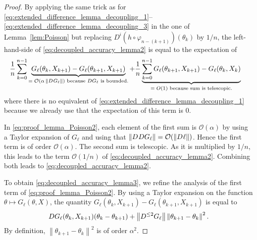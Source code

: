 \documentclass{article}
\newcommand\norm[1]{\left\|#1\right\|}
\newcommand\bO[1]{\mathcal{O}(#1)}
\newcommand\normop[2][]{\norm{D^{\ifthenelse{\equal{#1}{}}{}{\le #1}}#2}}
\begin{document}
\begin{proof}
    By applying the same trick as for \eqref{eq:extended_difference_lemma_decoupling_1}--\eqref{eq:extended_difference_lemma_decoupling_3} in the one of Lemma~\ref{lem:Poisson} but replacing $D^i(h \circ \varphi_{n-(k+1)})(\theta_{k})$ by $1/n$, the left-hand-side of \eqref{eq:decoupled_accuracy_lemma2} is equal to the expectation of
    \begin{align}
        \label{eq:proof_lemma_Poisson2}
        &\frac1n \sum_{k=0}^{n-1}\underbrace{G_\ell(\theta_{k}, X_{k+1}) - G_\ell(\theta_{k+1}, X_{k+1})}_{\text{$=\bO{\alpha\normop{G_\ell}}$ because $DG_\ell$ is bounded.}}
         + \frac1n \underbrace{ \sum_{k=0}^{n-1} G_\ell(\theta_{k+1}, X_{k+1}) - G_\ell(\theta_{k}, X_{k})}_{\text{$=O(1)$ because sum is telescopic.}}
    \end{align}
    where there is no equivalent of \eqref{eq:extended_difference_lemma_decoupling_1} because we already use that the expectation of this term is $0$. 
    
    In \eqref{eq:proof_lemma_Poisson2}, each element of the first sum is $\bO{\alpha}$ by using a Taylor expansion of $G_\ell$ and using that $\normop{DG_\ell}=\bO{\normop{\ell}}$. Hence the first term is of order $\bO{\alpha}$. The second sum is telescopic. As it is multiplied by $1/n$, this leads to the term $\bO{1/n}$ of \eqref{eq:decoupled_accuracy_lemma2}. Combining both leads to \eqref{eq:decoupled_accuracy_lemma2}. 
    
    \medskip
    
    To obtain \eqref{eq:decoupled_accuracy_lemma3}, we refine the analysis of the first term of \eqref{eq:proof_lemma_Poisson2}. By using a Taylor expansion on the function $\theta\mapsto G_\ell(\theta,X)$, the quantity $ G_\ell(\theta_{k}, X_{k+1}) - G_\ell(\theta_{k+1}, X_{k+1}) $ is equal to
    \begin{align}
       DG_\ell(\theta_k,X_{k+1})(\theta_k-\theta_{k+1}) + \normop[2]{G_\ell}\norm{\theta_{k+1}-\theta_k}^2.
       \label{eq:sum_of_two_terms_bound3}
    \end{align}
    By definition, $\norm{\theta_{k+1}-\theta_k}^2$ is of order $\alpha^2$. 
    

\end{proof}
\end{document}
